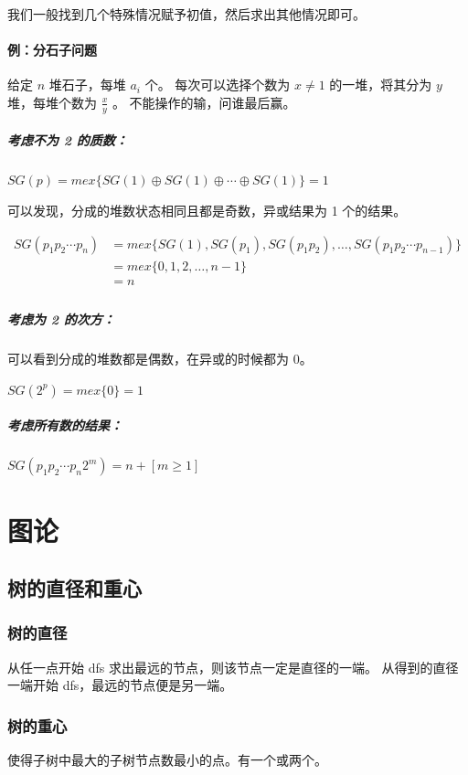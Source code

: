 \documentclass[a4paper,11pt]{article}
\begin{document}
我们一般找到几个特殊情况赋予初值，然后求出其他情况即可。

\paragraph{例：分石子问题}
\leavevmode

给定 \(n\) 堆石子，每堆 \(a_i\) 个。
每次可以选择个数为 \(x\not=1\) 的一堆，将其分为 \(y\) 堆，每堆个数为 \(\frac{x}{y}\) 。
不能操作的输，问谁最后赢。

\subparagraph{考虑不为 2 的质数：}
\leavevmode

\(SG(p) = mex\lbrace{SG(1)\oplus SG(1)\oplus \cdots \oplus SG(1)}\rbrace=1\)

可以发现，分成的堆数状态相同且都是奇数，异或结果为 1 个的结果。

\[
\begin{aligned}
  SG(p_1p_2\cdots p_n)&= mex\lbrace{SG(1), SG(p_1), SG(p_1p_2), \dots, SG(p_1p_2\cdots p_{n-1})}\rbrace \\
  &=mex\lbrace{0,1,2,\dots,n-1}\rbrace \\
  &=n \\
\end{aligned}
\]

\subparagraph{考虑为 2 的次方：}
\leavevmode

可以看到分成的堆数都是偶数，在异或的时候都为 0。

\(SG(2^p) = mex\lbrace {0}\rbrace = 1\)

\subparagraph{考虑所有数的结果：}
\leavevmode

\(SG(p_1p_2\cdots p_n2^m) = n + [m \ge 1]\)



\newpage
\section{图论}
\subsection{树的直径和重心}
\subsubsection{树的直径}
从任一点开始 dfs 求出最远的节点，则该节点一定是直径的一端。
从得到的直径一端开始 dfs，最远的节点便是另一端。
\subsubsection{树的重心}
使得子树中最大的子树节点数最小的点。有一个或两个。
\end{document}
